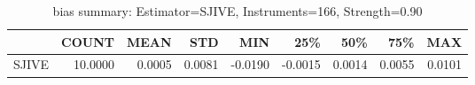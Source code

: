 \begin{table}[ht]
\centering
\caption{bias summary: Estimator=SJIVE, Instruments=166, Strength=0.90}
\begin{tabular}{lrrrrrrrr}
\toprule
 & COUNT & MEAN & STD & MIN & 25\% & 50\% & 75\% & MAX \\
\midrule
SJIVE & 10.0000 & 0.0005 & 0.0081 & -0.0190 & -0.0015 & 0.0014 & 0.0055 & 0.0101 \\
\bottomrule
\end{tabular}
\end{table}
